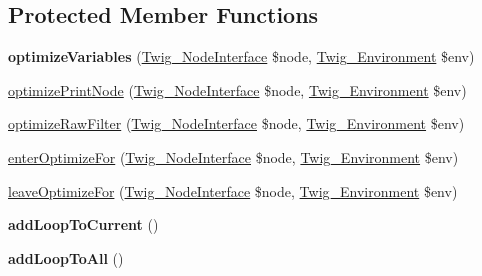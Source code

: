 \subsection*{Protected Member Functions}
\begin{DoxyCompactItemize}
\item 
\hypertarget{class_twig___node_visitor___optimizer_ae205530bb3c2c2d6a09bf576d1ae6734}{}{\bfseries optimize\+Variables} (\hyperlink{interface_twig___node_interface}{Twig\+\_\+\+Node\+Interface} \$node, \hyperlink{class_twig___environment}{Twig\+\_\+\+Environment} \$env)\label{class_twig___node_visitor___optimizer_ae205530bb3c2c2d6a09bf576d1ae6734}

\item 
\hyperlink{class_twig___node_visitor___optimizer_ab78709a00556e7e1acfae524088c8db8}{optimize\+Print\+Node} (\hyperlink{interface_twig___node_interface}{Twig\+\_\+\+Node\+Interface} \$node, \hyperlink{class_twig___environment}{Twig\+\_\+\+Environment} \$env)
\item 
\hyperlink{class_twig___node_visitor___optimizer_a5e719232a12b2343be5df5762e134227}{optimize\+Raw\+Filter} (\hyperlink{interface_twig___node_interface}{Twig\+\_\+\+Node\+Interface} \$node, \hyperlink{class_twig___environment}{Twig\+\_\+\+Environment} \$env)
\item 
\hyperlink{class_twig___node_visitor___optimizer_a20bda337e18b18e6a0846c0588b91d6f}{enter\+Optimize\+For} (\hyperlink{interface_twig___node_interface}{Twig\+\_\+\+Node\+Interface} \$node, \hyperlink{class_twig___environment}{Twig\+\_\+\+Environment} \$env)
\item 
\hyperlink{class_twig___node_visitor___optimizer_aa054b24131ed6ca4d122776b9dceba3a}{leave\+Optimize\+For} (\hyperlink{interface_twig___node_interface}{Twig\+\_\+\+Node\+Interface} \$node, \hyperlink{class_twig___environment}{Twig\+\_\+\+Environment} \$env)
\item 
\hypertarget{class_twig___node_visitor___optimizer_a46f27e97af2bb857f9c6668bb0cf735c}{}{\bfseries add\+Loop\+To\+Current} ()\label{class_twig___node_visitor___optimizer_a46f27e97af2bb857f9c6668bb0cf735c}

\item 
\hypertarget{class_twig___node_visitor___optimizer_abcc001ca4d4620ca8ef8844333bafa9a}{}{\bfseries add\+Loop\+To\+All} ()\label{class_twig___node_visitor___optimizer_abcc001ca4d4620ca8ef8844333bafa9a}

\end{DoxyCompactItemize}
